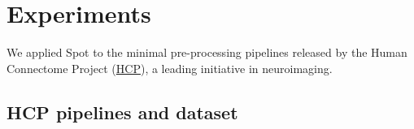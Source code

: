 \documentclass[a4paper,num-refs]{oup-contemporary}
\newcommand{\toolname}[0]{Spot\xspace}
\begin{document}
\section{Experiments}

We applied \toolname to the minimal
pre-processing pipelines released by the Human Connectome Project
(\href{https://www.humanconnectome.org}{HCP}), a leading initiative in
neuroimaging. 




\subsection{HCP pipelines and dataset}

\end{document}

